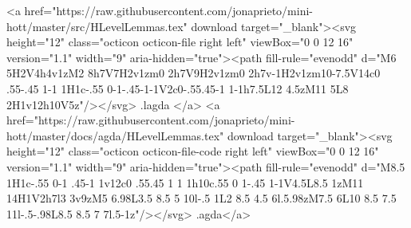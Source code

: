         <a href="https://raw.githubusercontent.com/jonaprieto/mini-hott/master/src/HLevelLemmas.tex" download target="_blank"><svg height="12" class="octicon octicon-file right left" viewBox="0 0 12 16" version="1.1" width="9" aria-hidden="true"><path fill-rule="evenodd" d="M6 5H2V4h4v1zM2 8h7V7H2v1zm0 2h7V9H2v1zm0 2h7v-1H2v1zm10-7.5V14c0 .55-.45 1-1 1H1c-.55 0-1-.45-1-1V2c0-.55.45-1 1-1h7.5L12 4.5zM11 5L8 2H1v12h10V5z"/></svg> .lagda </a>
        <a href="https://raw.githubusercontent.com/jonaprieto/mini-hott/master/docs/agda/HLevelLemmas.tex" download target="_blank"><svg height="12" class="octicon octicon-file-code right left" viewBox="0 0 12 16" version="1.1" width="9" aria-hidden="true"><path fill-rule="evenodd" d="M8.5 1H1c-.55 0-1 .45-1 1v12c0 .55.45 1 1 1h10c.55 0 1-.45 1-1V4.5L8.5 1zM11 14H1V2h7l3 3v9zM5 6.98L3.5 8.5 5 10l-.5 1L2 8.5 4.5 6l.5.98zM7.5 6L10 8.5 7.5 11l-.5-.98L8.5 8.5 7 7l.5-1z"/></svg> .agda</a>
      
